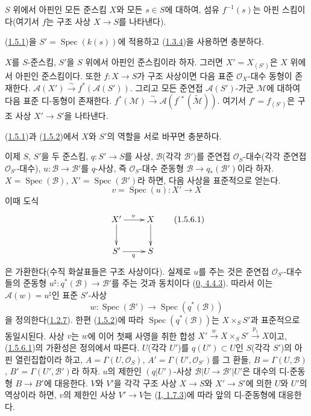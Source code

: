 \begin{env}[1.5.4]
\label{II.1.5.4-ko}
$S$ 위에서 아핀인 모든 준스킴 $X$와 모든 $s\in S$에 대하여, 섬유
$f^{-1}(s)$는 아핀 스킴이다(여기서 $f$는 구조 사상 $X\to S$를
나타낸다).
\end{env}

(\hyperref[II.1.5.1-ko]{1.5.1})을 $S'=\operatorname{Spec}(k(s))$에
적용하고 (\hyperref[II.1.3.4-ko]{1.3.4})을 사용하면 충분하다.

\begin{corollary}[1.5.5]
\label{II.1.5.5-ko}
$X$를 $S$-준스킴, $S'$을 $S$ 위에서 아핀인 준스킴이라 하자. 그러면
$X'=X_{(S')}$은 $X$ 위에서 아핀인 준스킴이다. 또한 $f:X\to S$가
구조 사상이면 다음 표준 $\mathcal{O}_X$-대수 동형이 존재한다.
$\mathcal{A}(X')\xrightarrow{\sim}f^*(\mathcal{A}(S'))$.
그리고 모든 준연접 $\mathcal{A}(S')$-가군 $\mathcal{M}$에 대하여 다음
표준 디-동형이 존재한다.
$f^*(\mathcal{M})\xrightarrow{\sim}
\mathcal{A}(f^{\prime*}(\widetilde{\mathcal{M}}))$.
여기서 $f'=f_{(S')}$은 구조 사상 $X'\to S'$을 나타낸다.
\end{corollary}

(\hyperref[II.1.5.1-ko]{1.5.1})과
(\hyperref[II.1.5.2-ko]{1.5.2})에서 $X$와 $S'$의 역할을 서로 바꾸면
충분하다.

\begin{env}[1.5.6]
\label{II.1.5.6-ko}
이제 $S$, $S'$을 두 준스킴, $q:S'\to S$를 사상,
$\mathcal{B}$(각각 $\mathcal{B}'$)를 준연접
$\mathcal{O}_S$-대수(각각 준연접 $\mathcal{O}_{S'}$-대수),
$u:\mathcal{B}\to\mathcal{B}'$를 $q$-사상, 즉 $\mathcal{O}_S$-대수
준동형 $\mathcal{B}\to q_*(\mathcal{B}')$이라 하자.
$X=\operatorname{Spec}(\mathcal{B})$,
$X'=\operatorname{Spec}(\mathcal{B}')$라 하면, 다음 사상을 표준적으로
얻는다.
\[
  v=\operatorname{Spec}(u):X'\to X
\]
이때 도식
\[
  \xymatrix{
    X'\ar[r]^v\ar[d] & X\ar[d]\\
    S'\ar[r]_q & S
  }
  \tag{1.5.6.1}\label{II.1.5.6.1-ko}
\]
은 가환한다(수직 화살표들은 구조 사상이다). 실제로 $u$를 주는 것은
준연접 $\mathcal{O}_{S'}$-대수들의 준동형
$u^\sharp:q^*(\mathcal{B})\to\mathcal{B}'$를 주는 것과 동치이다
(\hyperref[0.4.4.3-ko]{0, 4.4.3}). 따라서 이는
$\mathcal{A}(w)=u^\sharp$인 표준 $S'$-사상
\[
  w:\operatorname{Spec}(\mathcal{B}')\to
  \operatorname{Spec}(q^*(\mathcal{B}))
\]
을 정의한다(\hyperref[II.1.2.7-ko]{1.2.7}). 한편
(\hyperref[II.1.5.2-ko]{1.5.2})에 따라
$\operatorname{Spec}(q^*(\mathcal{B}))$는 $X\times_S S'$과 표준적으로
동일시된다. 사상 $v$는 $w$에 이어 첫째 사영을 취한 합성
$X'\xrightarrow{w}X\times_S S'\xrightarrow{p_1}X$이고,
(\hyperref[II.1.5.6.1-ko]{1.5.6.1})의 가환성은 정의에서 따른다.
$U$(각각 $U'$)를 $q(U')\subset U$인 $S$(각각 $S'$)의 아핀
열린집합이라 하고,
$A=\Gamma(U,\mathcal{O}_S)$,
$A'=\Gamma(U',\mathcal{O}_{S'})$를 그 환들,
$B=\Gamma(U,\mathcal{B})$,
$B'=\Gamma(U',\mathcal{B}')$라 하자. $u$의 제한인
$(q|U')$-사상 $\mathcal{B}|U\to\mathcal{B}'|U'$은 대수의
디-준동형 $B\to B'$에 대응한다. $V$와 $V'$을 각각 구조 사상
$X\to S$와 $X'\to S'$에 의한 $U$와 $U'$의 역상이라 하면, $v$의 제한인 사상
$V'\to V$는 (\hyperref[I.1.7.3-ko]{I, 1.7.3})에 따라 앞의
디-준동형에 대응한다.
\end{env}

